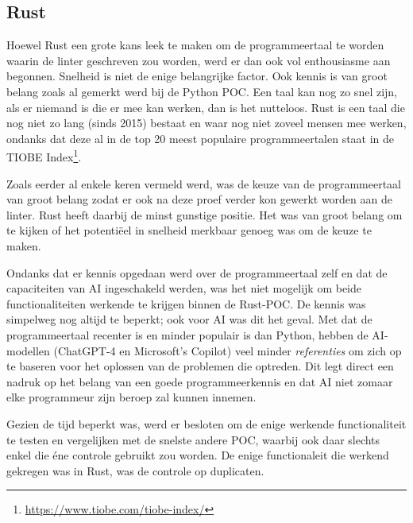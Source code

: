 \subsection{Rust}
Hoewel Rust een grote kans leek te maken om de programmeertaal te worden waarin de linter geschreven zou worden, werd er dan ook vol enthousiasme aan begonnen. Snelheid is niet de enige belangrijke factor. Ook kennis is van groot belang zoals al gemerkt werd bij de Python \acrshort{POC}. Een taal kan nog zo snel zijn, als er niemand is die er mee kan werken, dan is het nutteloos. Rust is een taal die nog niet zo lang (sinds 2015) bestaat en waar nog niet zoveel mensen mee werken, ondanks dat deze al in de top 20 meest populaire programmeertalen staat in de TIOBE Index\footnote{\url{https://www.tiobe.com/tiobe-index/}}.

Zoals eerder al enkele keren vermeld werd, was de keuze van de programmeertaal van groot belang zodat er ook na deze proef verder kon gewerkt worden aan de linter. Rust heeft daarbij de minst gunstige positie. Het was van groot belang om te kijken of het potentiëel in snelheid merkbaar genoeg was om de keuze te maken.

Ondanks dat er kennis opgedaan werd over de programmeertaal zelf en dat de capaciteiten van \acrshort{AI} ingeschakeld werden, was het niet mogelijk om beide functionaliteiten werkende te krijgen binnen de Rust-\acrshort{POC}. De kennis was simpelweg nog altijd te beperkt; ook voor \acrshort{AI} was dit het geval. Met dat de programmeertaal recenter is en minder populair is dan Python, hebben de \acrshort{AI}-modellen (ChatGPT-4 en Microsoft's Copilot) veel minder \emph{referenties} om zich op te baseren voor het oplossen van de problemen die optreden. Dit legt direct een nadruk op het belang van een goede programmeerkennis en dat \acrfull{AI} niet zomaar elke programmeur zijn beroep zal kunnen innemen.

Gezien de tijd beperkt was, werd er besloten om de enige werkende functionaliteit te testen en vergelijken met de snelste andere \acrshort{POC}, waarbij ook daar slechts enkel die éne controle gebruikt zou worden. De enige functionaleit die werkend gekregen was in Rust, was de controle op duplicaten.

